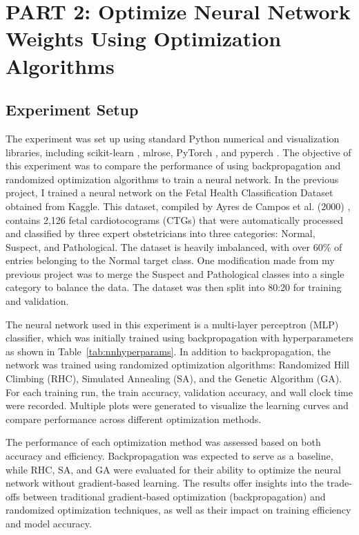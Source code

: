 \section{PART 2: Optimize Neural Network Weights Using Optimization Algorithms}
\subsection{Experiment Setup}
The experiment was set up using standard Python numerical and visualization libraries, including scikit-learn \cite{scikit-learn}, mlrose, PyTorch \cite{paszke2017automatic}, and pyperch \cite{pyperch2023}. The objective of this experiment was to compare the performance of using backpropagation and randomized optimization algorithms to train a neural network. In the previous project, I trained a neural network on the Fetal Health Classification Dataset obtained from Kaggle. This dataset, compiled by Ayres de Campos et al. (2000) \cite{ayres2000sisporto}, contains 2,126 fetal cardiotocograms (CTGs) that were automatically processed and classified by three expert obstetricians into three categories: Normal, Suspect, and Pathological. The dataset is heavily imbalanced, with over 60\% of entries belonging to the Normal target class. One modification made from my previous project was to merge the Suspect and Pathological classes into a single category to balance the data. The dataset was then split into 80:20 for training and validation.

The neural network used in this experiment is a multi-layer perceptron (MLP) classifier, which was initially trained using backpropagation with hyperparameters as shown in Table~\ref{tab:nnhyperparams}. In addition to backpropagation, the network was trained using randomized optimization algorithms: Randomized Hill Climbing (RHC), Simulated Annealing (SA), and the Genetic Algorithm (GA). For each training run, the train accuracy, validation accuracy, and wall clock time were recorded. Multiple plots were generated to visualize the learning curves and compare performance across different optimization methods.

The performance of each optimization method was assessed based on both accuracy and efficiency. Backpropagation was expected to serve as a baseline, while RHC, SA, and GA were evaluated for their ability to optimize the neural network without gradient-based learning. The results offer insights into the trade-offs between traditional gradient-based optimization (backpropagation) and randomized optimization techniques, as well as their impact on training efficiency and model accuracy.

